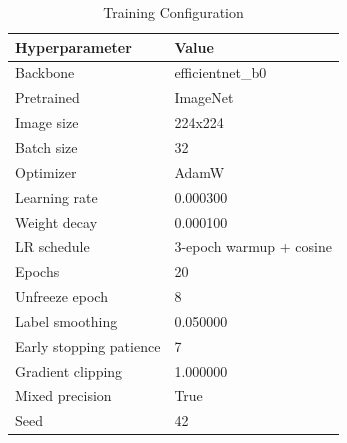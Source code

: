 \begin{table}
\caption{Training Configuration}
\label{tab:trainconfig}
\begin{tabular}{ll}
\toprule
Hyperparameter & Value \\
\midrule
Backbone & efficientnet\_b0 \\
Pretrained & ImageNet \\
Image size & 224x224 \\
Batch size & 32 \\
Optimizer & AdamW \\
Learning rate & 0.000300 \\
Weight decay & 0.000100 \\
LR schedule & 3-epoch warmup + cosine \\
Epochs & 20 \\
Unfreeze epoch & 8 \\
Label smoothing & 0.050000 \\
Early stopping patience & 7 \\
Gradient clipping & 1.000000 \\
Mixed precision & True \\
Seed & 42 \\
\bottomrule
\end{tabular}
\end{table}

